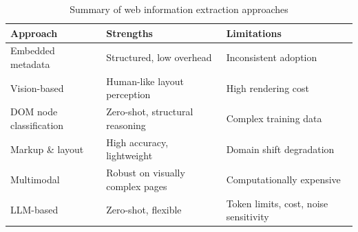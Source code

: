 \begin{table}[h]
    \centering
    \small
    \renewcommand{\arraystretch}{1.4}
    \begin{tabularx}{\textwidth}{p{4.5cm} X X}
        \toprule
        \textbf{Approach} & \textbf{Strengths} & \textbf{Limitations} \\
        \midrule
        Embedded metadata & Structured, low overhead & Inconsistent adoption \\
        Vision-based & Human-like layout perception & High rendering cost \\
        DOM node classification & Zero-shot, structural reasoning & Complex training data \\
        Markup \& layout & High accuracy, lightweight & Domain shift degradation \\
        Multimodal & Robust on visually complex pages & Computationally expensive \\
        LLM-based & Zero-shot, flexible & Token limits, cost, noise sensitivity \\
        \bottomrule
    \end{tabularx}
    \caption{Summary of web information extraction approaches}
    \label{tab:web_info_extraction_summary}
\end{table}


